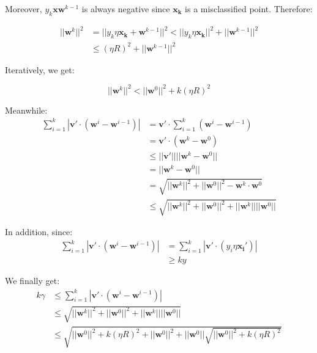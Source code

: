 \documentclass{article}
\newcommand{\V}[1]{\boldsymbol{#1}}
\begin{document}
Moreover, \(y_k\V{x}\V{w}^{k-1}\) is always negative since \(\V{x_k}\) is a
misclassified point. Therefore:

\begin{equation}
\begin{aligned}
||\V{w}^k||^2&=||y_k\eta\V{x_k} +\V{w}^{k-1}||^2<||y_k\eta \V{x_k}||^2+||\V{w}^{k-1}||^2\\
&\leq (\eta R)^2 + ||\V{w}^{k-1}||^2
\end{aligned}
\end{equation}

Iteratively, we get:

\begin{equation}
||\V{w}^k||^2<||\V{w}^0||^2+k(\eta R)^2
\end{equation}

Meanwhile:
\begin{equation}
\begin{aligned}
\sum_{i=1}^k|\V{v'}\cdot (\V{w}^i-\V{w}^{i-1})|&=\V{v'}\cdot\sum_{i=1}^k(\V{w}^i-\V{w}^{i-1})\\
&=\V{v'}\cdot (\V{w}^k-\V{w}^0)\\
&\leq ||\V{v'}||||\V{w}^k-\V{w}^0||\\
&=||\V{w}^k-\V{w}^0||\\
&= \sqrt{||\V{w}^k||^2 + ||\V{w}^0||^2 - \V{w}^k \cdot \V{w}^0}\\
&\leq \sqrt{||\V{w}^k||^2+||\V{w}^0||^2+||\V{w}^k||||\V{w}^0||}
\end{aligned}
\end{equation}

In addition, since:
\begin{equation}
\begin{aligned}
\sum_{i=1}^k|\V{v'}\cdot (\V{w}^i-\V{w}^{i-1})|&=\sum_{i=1}^k|\V{v'}\cdot (y_i\eta\V{x_i}')|\\
&\geq ky
\end{aligned}
\end{equation}

We finally get:
\begin{equation}
\begin{aligned}
k\gamma &\leq \sum_{i=1}^k|\V{v'}\cdot (\V{w}^i-\V{w}^{i-1})|\\
&\leq \sqrt{||\V{w}^k||^2+||\V{w}^0||^2+||\V{w}^k||||\V{w}^0||}\\
&\leq\sqrt{||\V{w}^0||^2+k(\eta R)^2+||\V{w}^0||^2+||\V{w}^0||\sqrt{||\V{w}^0||^2+k(\eta R)^2}}
\end{aligned}
\end{equation}
\end{document}
